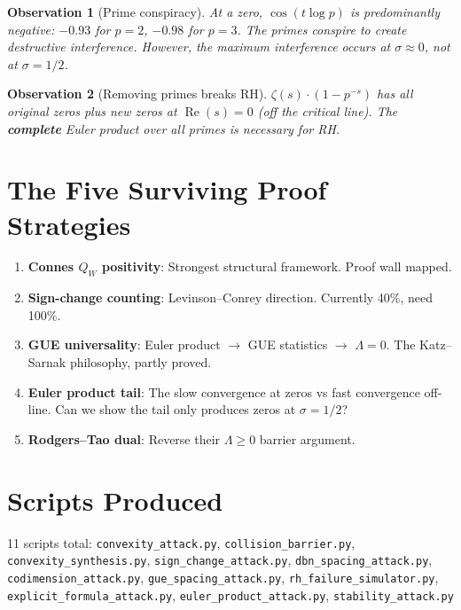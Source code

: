\documentclass[11pt]{article}
\newtheorem{observation}{Observation}
\begin{document}
\begin{observation}[Prime conspiracy]
At a zero, $\cos(t \log p)$ is predominantly negative: $-0.93$ for $p=2$, $-0.98$ for $p=3$. The primes conspire to create destructive interference. However, the maximum interference occurs at $\sigma \approx 0$, not at $\sigma = 1/2$.
\end{observation}

\begin{observation}[Removing primes breaks RH]
$\zeta(s) \cdot (1 - p^{-s})$ has all original zeros plus new zeros at $\operatorname{Re}(s) = 0$ (off the critical line). The \textbf{complete} Euler product over all primes is necessary for RH.
\end{observation}

\section{The Five Surviving Proof Strategies}

\begin{enumerate}
\item \textbf{Connes $Q_W$ positivity}: Strongest structural framework. Proof wall mapped.
\item \textbf{Sign-change counting}: Levinson--Conrey direction. Currently 40\%, need 100\%.
\item \textbf{GUE universality}: Euler product $\to$ GUE statistics $\to$ $\Lambda = 0$. The Katz--Sarnak philosophy, partly proved.
\item \textbf{Euler product tail}: The slow convergence at zeros vs fast convergence off-line. Can we show the tail only produces zeros at $\sigma = 1/2$?
\item \textbf{Rodgers--Tao dual}: Reverse their $\Lambda \geq 0$ barrier argument.
\end{enumerate}

\section{Scripts Produced}
11 scripts total:
\texttt{convexity\_attack.py}, \texttt{collision\_barrier.py}, \texttt{convexity\_synthesis.py}, \texttt{sign\_change\_attack.py}, \texttt{dbn\_spacing\_attack.py}, \texttt{codimension\_attack.py}, \texttt{gue\_spacing\_attack.py}, \texttt{rh\_failure\_simulator.py}, \texttt{explicit\_formula\_attack.py}, \texttt{euler\_product\_attack.py}, \texttt{stability\_attack.py}
\end{document}
